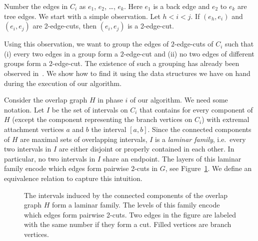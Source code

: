\documentclass[paper=a4]{scrartcl}
\begin{document}
Number the edges in $C_i$ as $e_1$, $e_2$, \ldots, $e_k$. Here $e_1$ is a back edge and $e_2$ to $e_k$ are tree edges. We start with a simple observation. Let $h < i < j$. If $(e_h,e_i)$ and $(e_i,e_j)$ are 2-edge-cuts, then $(e_i,e_j)$ is a 2-edge-cut.

Using this observation, we want to group the edges of $2$-edge-cuts of $C_i$ such that (i) every two edges in a group form a $2$-edge-cut and (ii) no two edges of different groups form a $2$-edge-cut. The existence of such a grouping has already been observed in~\cite{Nagamochi1992a,Taoka1992,Tsin2009}. We show how to find it using the data structures we have on hand during the execution of our algorithm.

Consider the overlap graph $H$ in phase $i$ of our algorithm. We need some notation. Let $I$ be the set of intervals on $C_i$ that contains for every component of $H$ (except the component representing the branch vertices on $C_i$) with extremal attachment vertices $a$ and $b$ the interval $[a,b]$. Since the connected components of $H$ are maximal sets of overlapping intervals, $I$ is a \emph{laminar family}, i.e.\ every two intervals in $I$ are either disjoint or properly contained in each other. In particular, no two intervals in $I$ share an endpoint.
The layers of this laminar family encode which edges form pairwise 2-cuts in $G$, see Figure~\ref{fig:laminar family}. We define an equivalence relation to capture this intuition.

\begin{figure}
\centering
{}
\caption{The intervals induced by the connected components of the overlap graph $H$ form a laminar family. The levels of this family encode which edges form pairwise 2-cuts. Two edges in the figure are labeled with the same number if they form a cut. Filled vertices are branch vertices.}
\label{fig:laminar family}
\end{figure}
\end{document}
